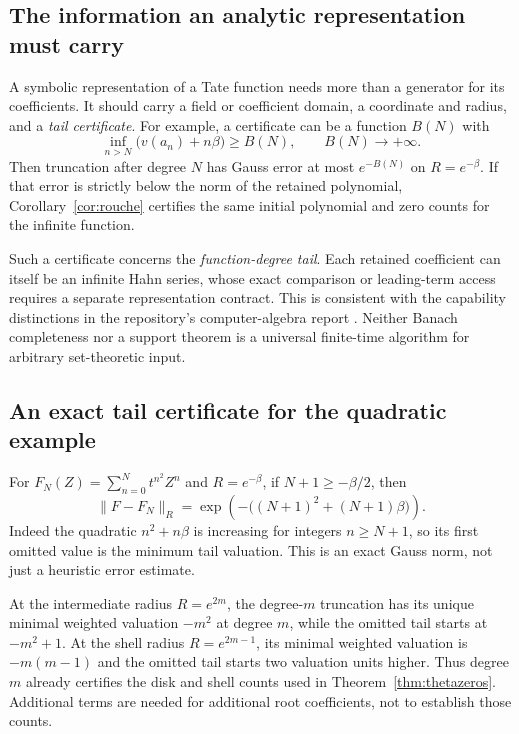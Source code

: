 \documentclass[11pt,a4paper]{article}
\numberwithin{equation}{section}
\theoremstyle{definition}
\theoremstyle{remark}
\newcommand{\Gauss}[2]{\lVert#1\rVert_{#2}}
\begin{document}
\subsection{The information an analytic representation must carry}
A symbolic representation of a Tate function needs more than a generator for
its coefficients. It should carry a field or coefficient domain, a coordinate
and radius, and a \emph{tail certificate}. For example, a certificate can be a
function $B(N)$ with
\[
 \inf_{n>N}\bigl(v(a_n)+n\beta\bigr)\ge B(N),
 \qquad B(N)\longrightarrow+\infty.
\]
Then truncation after degree $N$ has Gauss error at most $e^{-B(N)}$ on
$R=e^{-\beta}$. If that error is strictly below the norm of the retained
polynomial, Corollary~\ref{cor:rouche} certifies the same initial polynomial
and zero counts for the infinite function.

Such a certificate concerns the \emph{function-degree tail}. Each retained
coefficient can itself be an infinite Hahn series, whose exact comparison or
leading-term access requires a separate representation contract. This is
consistent with the capability distinctions in the repository's computer-algebra
report \cite{RepoCAS}. Neither Banach completeness nor a support theorem is a
universal finite-time algorithm for arbitrary set-theoretic input.

\subsection{An exact tail certificate for the quadratic example}
For $F_N(Z)=\sum_{n=0}^N t^{n^2}Z^n$ and $R=e^{-\beta}$, if
$N+1\ge-\beta/2$, then
\begin{equation}\label{eq:tailcertificate}
 \Gauss{F-F_N}R
 =\exp\!\left(-\bigl((N+1)^2+(N+1)\beta\bigr)\right).
\end{equation}
Indeed the quadratic $n^2+n\beta$ is increasing for integers $n\ge N+1$,
so its first omitted value is the minimum tail valuation. This is an exact
Gauss norm, not just a heuristic error estimate.

At the intermediate radius $R=e^{2m}$, the degree-$m$ truncation has its unique
minimal weighted valuation $-m^2$ at degree $m$, while the omitted tail starts
at $-m^2+1$. At the shell radius $R=e^{2m-1}$, its minimal weighted valuation
is $-m(m-1)$ and the omitted tail starts two valuation units higher. Thus degree
$m$ already certifies the disk and shell counts used in
Theorem~\ref{thm:thetazeros}. Additional terms are needed for additional root
coefficients, not to establish those counts.
\end{document}
